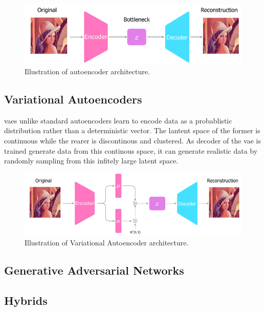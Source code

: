\begin{figure}[!h]
    \centering
    \includegraphics[scale=1]{figures/ae_arch.pdf}
    \caption{Illustration of autoencoder architecture.}
    \label{fig:ar_arch}
\end{figure}

\subsection{Variational Autoencoders}
\acp{vae} unlike standard autoencoders learn to encode data as a probablistic distribution rather than a deterministic vector. The lantent space of the former is continuous while the rearer is discontinous and clustered. As decoder of the \ac{vae} is trained generate data from this continous space, it can generate realistic data by randomly sampling from this infitely large latent space.

\begin{figure}[!h]
    \centering
    \includegraphics[scale=1]{figures/vae_arch.pdf}
    \caption{Illustration of Variational Autoencoder architecture.}
    \label{fig:vae_arch}
\end{figure}

\subsection{Generative Adversarial Networks}


\subsection{Hybrids}


